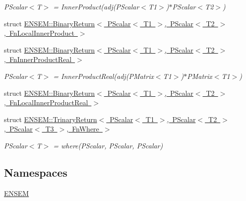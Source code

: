 \begin{DoxyCompactItemize}
\begin{DoxyCompactList}\small\item\em P\+Scalar$<$\+T$>$ = Inner\+Product(adj(\+P\+Scalar$<$\+T1$>$)$\ast$\+P\+Scalar$<$\+T2$>$) \end{DoxyCompactList}\item 
struct \mbox{\hyperlink{structENSEM_1_1BinaryReturn_3_01PScalar_3_01T1_01_4_00_01PScalar_3_01T2_01_4_00_01FnLocalInnerProduct_01_4}{E\+N\+S\+E\+M\+::\+Binary\+Return$<$ P\+Scalar$<$ T1 $>$, P\+Scalar$<$ T2 $>$, Fn\+Local\+Inner\+Product $>$}}
\item 
struct \mbox{\hyperlink{structENSEM_1_1BinaryReturn_3_01PScalar_3_01T1_01_4_00_01PScalar_3_01T2_01_4_00_01FnInnerProductReal_01_4}{E\+N\+S\+E\+M\+::\+Binary\+Return$<$ P\+Scalar$<$ T1 $>$, P\+Scalar$<$ T2 $>$, Fn\+Inner\+Product\+Real $>$}}
\begin{DoxyCompactList}\small\item\em P\+Scalar$<$\+T$>$ = Inner\+Product\+Real(adj(\+P\+Matrix$<$\+T1$>$)$\ast$\+P\+Matrix$<$\+T1$>$) \end{DoxyCompactList}\item 
struct \mbox{\hyperlink{structENSEM_1_1BinaryReturn_3_01PScalar_3_01T1_01_4_00_01PScalar_3_01T2_01_4_00_01FnLocalInnerProductReal_01_4}{E\+N\+S\+E\+M\+::\+Binary\+Return$<$ P\+Scalar$<$ T1 $>$, P\+Scalar$<$ T2 $>$, Fn\+Local\+Inner\+Product\+Real $>$}}
\item 
struct \mbox{\hyperlink{structENSEM_1_1TrinaryReturn_3_01PScalar_3_01T1_01_4_00_01PScalar_3_01T2_01_4_00_01PScalar_3_01T3_01_4_00_01FnWhere_01_4}{E\+N\+S\+E\+M\+::\+Trinary\+Return$<$ P\+Scalar$<$ T1 $>$, P\+Scalar$<$ T2 $>$, P\+Scalar$<$ T3 $>$, Fn\+Where $>$}}
\begin{DoxyCompactList}\small\item\em P\+Scalar$<$\+T$>$ = where(\+P\+Scalar, P\+Scalar, P\+Scalar) \end{DoxyCompactList}\end{DoxyCompactItemize}
\subsection*{Namespaces}
\begin{DoxyCompactItemize}
\item 
 \mbox{\hyperlink{namespaceENSEM}{E\+N\+S\+EM}}
\end{DoxyCompactItemize}
